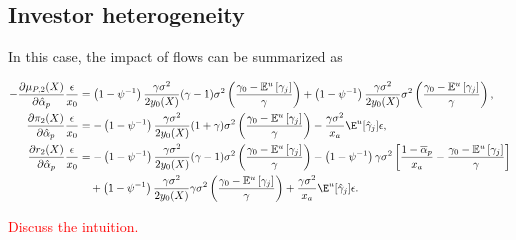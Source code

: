 \subsection{Investor heterogeneity}
In this case, the impact of flows can be summarized as
\begin{small}
	\begin{align*}
		-\frac{\partial\mu_{P,2}(X)}{\partial\hat{\alpha}_p}\frac{\epsilon}{x_0}&=\left(1-\psi^{-1}\right)\frac{\gamma\sigma^2}{2y_0(X)}(\gamma-1)\sigma^2\left(\frac{\gamma_{0}-\mathbb{E}^{u}\left[\gamma_{j}\right]}{\gamma}\right)
		+\left(1-\psi^{-1}\right)\frac{\gamma \sigma^{2}}{2 y_{0}(X)}\sigma^2\left(\frac{\gamma_{0}-\mathbb{E}^{u}\left[\gamma_{j}\right]}{\gamma}\right),\\
		\frac{\partial\pi_{2}(X)}{\partial\hat{\alpha}_p}\frac{\epsilon}{x_0}&=-\left(1-\psi^{-1}\right) \frac{\gamma \sigma^{2}}{2 y_{0}(X)}(1+\gamma)\sigma^2\left(\frac{\gamma_{0}-\mathbb{E}^{u}\left[\gamma_{j}\right]}{\gamma}\right)-\frac{\gamma\sigma^2}{x_a}\E^u[\hat{\gamma}_j]\epsilon,\\
		\frac{\partial r_{2}(X)}{\partial\hat{\alpha}_p}\frac{\epsilon}{x_0}&=
		-\left(1-\psi^{-1}\right)\frac{\gamma\sigma^2}{2y_0(X)}(\gamma-1)\sigma^2\left(\frac{\gamma_{0}-\mathbb{E}^{u}\left[\gamma_{j}\right]}{\gamma}\right)
		-\left(1-\psi^{-1}\right)\gamma\sigma^2\left[\frac{1-\overline{\alpha}_{p}}{x_{a}}-\frac{\gamma_{0}-\mathbb{E}^{u}\left[\gamma_{j}\right]}{\gamma}\right]\\
		&\quad+\left(1-\psi^{-1}\right)\frac{\gamma \sigma^{2}}{2 y_{0}(X)}\gamma\sigma^2\left(\frac{\gamma_{0}-\mathbb{E}^{u}\left[\gamma_{j}\right]}{\gamma}\right)+\frac{\gamma\sigma^2}{x_a}\E^u[\hat{\gamma}_j]\epsilon.
	\end{align*}
\end{small}
\textcolor{red}{Discuss the intuition.}

